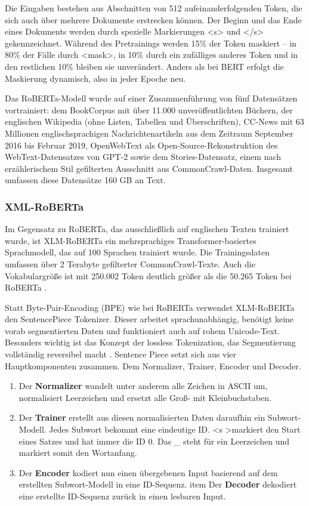 Die Eingaben bestehen aus Abschnitten von 512 aufeinanderfolgenden Token, die sich auch über mehrere Dokumente erstrecken können. 
Der Beginn und das Ende eines Dokuments werden durch spezielle Markierungen <s> und </s> gekennzeichnet. 
Während des Pretrainings werden 15\% der Token maskiert – in 80\% der Fälle durch <mask>, in 10\% durch 
ein zufälliges anderes Token und in den restlichen 10\% bleiben sie unverändert. 
Anders als bei BERT erfolgt die Maskierung dynamisch, also in jeder Epoche neu.

Das RoBERTa-Modell wurde auf einer Zusammenführung von fünf Datensätzen vortrainiert: dem BookCorpus mit über 11.000 
unveröffentlichten Büchern, der englischen Wikipedia (ohne Listen, Tabellen und Überschriften), 
CC-News mit 63 Millionen englischsprachigen Nachrichtenartikeln aus dem Zeitraum September 2016 bis Februar 2019, 
OpenWebText als Open-Source-Rekonstruktion des WebText-Datensatzes von GPT-2 sowie dem Stories-Datensatz, 
einem nach erzählerischem Stil gefilterten Ausschnitt aus CommonCrawl-Daten. Insgesamt umfassen diese Datensätze 160 GB an Text.

\subsubsection{XML-RoBERTa} \label{sec04:xml_roberta}

Im Gegensatz zu RoBERTa, das ausschließlich auf englischen Texten trainiert wurde, ist XLM-RoBERTa ein mehrsprachiges 
Transformer-basiertes Sprachmodell, das auf 100 Sprachen trainiert wurde. 
Die Trainingsdaten umfassen über 2 Terabyte gefilterter CommonCrawl-Texte.
Auch die Vokabulargröße ist mit 250.002 Token deutlich größer als die 50.265 Token bei RoBERTa \cite{DBLP:journals/corr/abs-1911-02116}.

Statt Byte-Pair-Encoding (BPE) wie bei RoBERTa verwendet XLM-RoBERTa den SentencePiece Tokenizer.
Dieser arbeitet sprachunabhängig, benötigt keine vorab segmentierten Daten und funktioniert auch auf rohem Unicode-Text. 
Besonders wichtig ist das Konzept der lossless Tokenization, das Segmentierung vollständig reversibel macht \cite{kudo-richardson-2018-sentencepiece}.
Sentence Piece setzt sich aus vier Hauptkomponenten zusammen. Dem Normalizer, Trainer, Encoder und Decoder. 

\begin{enumerate}
    \item Der \textbf{Normalizer} wandelt unter anderem alle Zeichen in ASCII um, normalisiert Leerzeichen und ersetzt alle Groß- mit Kleinbuchstaben.
    \item Der \textbf{Trainer} erstellt aus diesen normalisierten Daten daraufhin ein Subwort-Modell. Jedes Subwort bekommt eine eindeutige ID.
    \textless s \textgreater markiert den Start eines Satzes und hat immer die ID 0. Das \_ steht für ein Leerzeichen und markiert somit den Wortanfang.
    \item Der \textbf{Encoder} kodiert nun einen übergebenen Input basierend auf dem erstellten Subwort-Modell in eine ID-Sequenz.
    item Der \textbf{Decoder} dekodiert eine erstellte ID-Sequenz zurück in einen lesbaren Input.
\end{enumerate}

